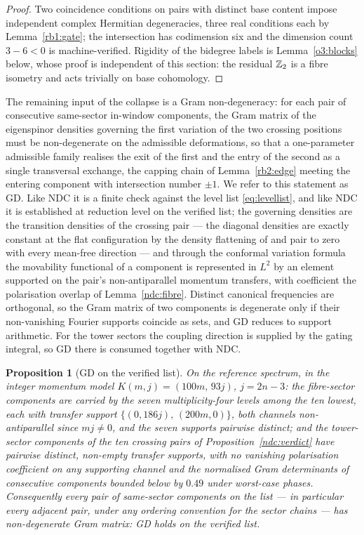 \documentclass[11pt]{article}
\numberwithin{equation}{section}
\theoremstyle{plain}
\newtheorem{proposition}[theorem]{Proposition}
\theoremstyle{definition}
\theoremstyle{remark}
\begin{document}
\begin{proof}
Two coincidence conditions on pairs with distinct base content
impose independent complex Hermitian degeneracies, three real
conditions each by Lemma~\ref{rb1:gate}; the intersection has
codimension six and the dimension count $3 - 6 < 0$ is
machine-verified. Rigidity of the bidegree labels is
Lemma~\ref{o3:blocks} below, whose proof is independent of this
section: the residual $\mathbb{Z}_2$ is a fibre isometry and acts
trivially on base cohomology.
\end{proof}

The remaining input of the collapse is a Gram non-degeneracy: for
each pair of consecutive same-sector in-window components, the Gram
matrix of the eigenspinor densities governing the first variation
of the two crossing positions must be non-degenerate on the
admissible deformations, so that a one-parameter admissible family
realises the exit of the first and the entry of the second as a
single transversal exchange, the capping chain of
Lemma~\ref{rb2:edge} meeting the entering component with
intersection number $\pm 1$. We refer to this statement as GD. Like
NDC it is a finite check against the level list
\eqref{eq:levellist}, and like NDC it is established at reduction
level on the verified list; the governing densities are the
transition densities of the crossing pair --- the diagonal
densities are exactly constant at the flat configuration by the
density flattening of \cite{MEF3} and pair to zero with every
mean-free direction --- and through the conformal variation formula
\cite{Kato, Hitchin1974, Hijazi, BourguignonGauduchon1992} the
movability functional of a component is represented in $L^{2}$ by
an element supported on the pair's non-antiparallel momentum
transfers, with coefficient the polarisation overlap of
Lemma~\textup{\ref{ndc:fibre}}. Distinct canonical frequencies are
orthogonal, so the Gram matrix of two components is degenerate only
if their non-vanishing Fourier supports coincide as sets, and GD
reduces to support arithmetic. For the tower sectors the coupling
direction is supplied by the gating integral, so GD there is
consumed together with NDC.

\begin{proposition}[GD on the verified list]\label{gd:verdict}
On the reference spectrum, in the integer momentum model
$K(m, j) = (100m,\, 93j)$, $j = 2n - 3$: the fibre-sector
components are carried by the seven multiplicity-four levels among
the ten lowest, each with transfer support
$\{(0, 186j),\, (200m, 0)\}$, both channels non-antiparallel since
$mj \neq 0$, and the seven supports pairwise distinct; and the
tower-sector components of the ten crossing pairs of
Proposition~\textup{\ref{ndc:verdict}} have pairwise distinct,
non-empty transfer supports, with no vanishing polarisation
coefficient on any supporting channel and the normalised Gram
determinants of consecutive components bounded below by $0.49$
under worst-case phases. Consequently every pair of same-sector
components on the list --- in particular every adjacent pair, under
any ordering convention for the sector chains --- has
non-degenerate Gram matrix: GD holds on the verified list.
\end{proposition}
\end{document}
